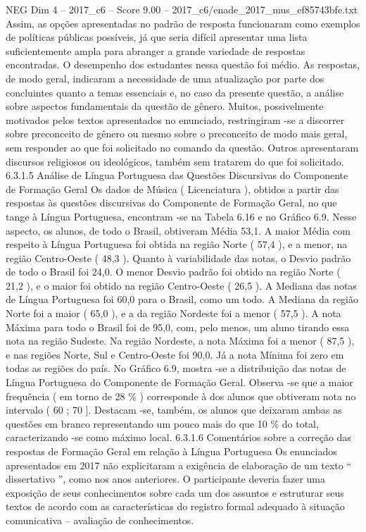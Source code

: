 \begin{textsample}{NEG Dim 4 – 2017\_c6 – Score 9.00 – 2017\_c6/enade\_2017\_mus\_ef85743bfe.txt}
Assim, as opções apresentadas no padrão de resposta funcionaram como exemplos de políticas públicas possíveis, já que seria difícil apresentar uma lista suficientemente ampla para abranger a grande variedade de respostas encontradas.
O desempenho dos estudantes nessa questão foi médio.
As respostas, de modo geral, indicaram a necessidade de uma atualização por parte dos concluintes quanto a temas essenciais e, no caso da presente questão, a análise sobre aspectos fundamentais da questão de gênero.
Muitos, possivelmente motivados pelos textos apresentados no enunciado, restringiram -se a discorrer sobre preconceito de gênero ou mesmo sobre o preconceito de modo mais geral, sem responder ao que foi solicitado no comando da questão.
Outros apresentaram discursos religiosos ou ideológicos, também sem tratarem do que foi solicitado. 6.3.1.5 Análise de Língua Portuguesa das Questões Discursivas do Componente de Formação Geral Os dados de Música ( Licenciatura ), obtidos a partir das respostas às questões discursivas do Componente de Formação Geral, no que tange à Língua Portuguesa, encontram -se na Tabela 6.16 e no Gráfico 6.9.
Nesse aspecto, os alunos, de todo o Brasil, obtiveram Média 53,1.
A maior Média com respeito à Língua Portuguesa foi obtida na região Norte ( 57,4 ), e a menor, na região Centro-Oeste ( 48,3 ).
Quanto à variabilidade das notas, o Desvio padrão de todo o Brasil foi 24,0.
O menor Desvio padrão foi obtido na região Norte ( 21,2 ), e o maior foi obtido na região Centro-Oeste ( 26,5 ).
A Mediana das notas de Língua Portuguesa foi 60,0 para o Brasil, como um todo.
A Mediana da região Norte foi a maior ( 65,0 ), e a da região Nordeste foi a menor ( 57,5 ).
A nota Máxima para todo o Brasil foi de 95,0, com, pelo menos, um aluno tirando essa nota na região Sudeste.
Na região Nordeste, a nota Máxima foi a menor ( 87,5 ), e nas regiões Norte, Sul e Centro-Oeste foi 90,0.
Já a nota Mínima foi zero em todas as regiões do país.
No Gráfico 6.9, mostra -se a distribuição das notas de Língua Portuguesa do Componente de Formação Geral.
Observa -se que a maior frequência ( em torno de 28 \% ) corresponde à dos alunos que obtiveram nota no intervalo ( 60 ; 70 ].
Destacam -se, também, os alunos que deixaram ambas as questões em branco representando um pouco mais do que 10 \% do total, caracterizando -se como máximo local. 6.3.1.6 Comentários sobre a correção das respostas de Formação Geral em relação à Língua Portuguesa Os enunciados apresentados em 2017 não explicitaram a exigência de elaboração de um texto “ dissertativo ”, como nos anos anteriores.
O participante deveria fazer uma exposição de seus conhecimentos sobre cada um dos assuntos e estruturar seus textos de acordo com as características do registro formal adequado à situação comunicativa – avaliação de conhecimentos.

\end{textsample}
